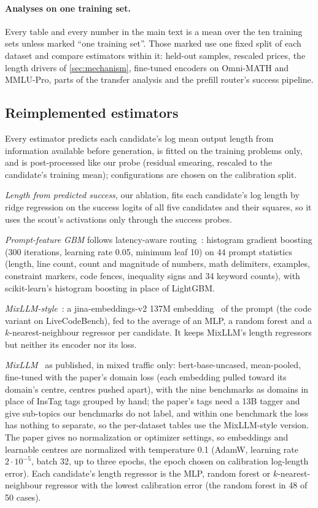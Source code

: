 \documentclass[10pt]{article}
\begin{document}
\paragraph{Analyses on one training set.} Every table and every number in the main text is a mean over the ten training sets unless marked ``one training set''. Those marked use one fixed split of each dataset and compare estimators within it: held-out samples, rescaled prices, the length drivers of \cref{sec:mechanism}, fine-tuned encoders on Omni-MATH and MMLU-Pro, parts of the transfer analysis and the prefill router's success pipeline.

\subsection{Reimplemented estimators}\label{app:baselines}
Every estimator predicts each candidate's log mean output length from information available before generation, is fitted on the training problems only, and is post-processed like our probe (residual smearing, rescaled to the candidate's training mean); configurations are chosen on the calibration split.

\emph{Length from predicted success}, our ablation, fits each candidate's log length by ridge regression on the success logits of all five candidates and their squares, so it uses the scout's activations only through the success probes.

\emph{Prompt-feature GBM} follows latency-aware routing~\citep{latencyrouting}: histogram gradient boosting (300 iterations, learning rate 0.05, minimum leaf 10) on 44 prompt statistics (length, line count, count and magnitude of numbers, math delimiters, examples, constraint markers, code fences, inequality signs and 34 keyword counts), with scikit-learn's histogram boosting in place of LightGBM.

\emph{MixLLM-style}~\citep{mixllm}: a jina-embeddings-v2 137M embedding~\citep{jina} of the prompt (the code variant on LiveCodeBench), fed to the average of an MLP, a random forest and a $k$-nearest-neighbour regressor per candidate. It keeps MixLLM's length regressors but neither its encoder nor its loss.

\emph{MixLLM}~\citep{mixllm} as published, in mixed traffic only: bert-base-uncased, mean-pooled, fine-tuned with the paper's domain loss (each embedding pulled toward its domain's centre, centres pushed apart), with the nine benchmarks as domains in place of InsTag tags grouped by hand; the paper's tags need a 13B tagger and give sub-topics our benchmarks do not label, and within one benchmark the loss has nothing to separate, so the per-dataset tables use the MixLLM-style version. The paper gives no normalization or optimizer settings, so embeddings and learnable centres are normalized with temperature 0.1 (AdamW, learning rate $2\cdot10^{-5}$, batch 32, up to three epochs, the epoch chosen on calibration log-length error). Each candidate's length regressor is the MLP, random forest or $k$-nearest-neighbour regressor with the lowest calibration error (the random forest in 48 of 50 cases).
\end{document}
